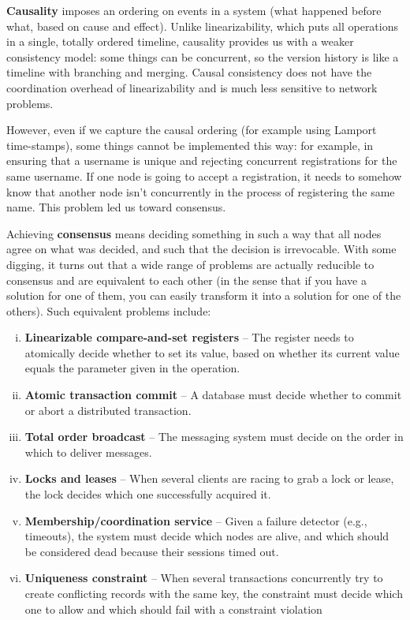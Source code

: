 \documentclass{article}
\begin{document}
    \textbf{Causality} imposes an ordering on events in a system (what happened before what, based on cause and effect). Unlike linearizability, which puts all operations in a single, totally ordered timeline, causality provides us with a weaker consistency model: some things can be concurrent, so the version history is like a timeline with branching and merging. Causal consistency does not have the coordination overhead of linearizability and is much less sensitive to network problems.
    
    However, even if we capture the causal ordering (for example using Lamport time-stamps), some things cannot be implemented this way: for example, in ensuring that a username is unique and rejecting concurrent registrations for the same username. If one node is going to accept a registration, it needs to somehow know that another node isn’t concurrently in the process of registering the same name. This problem led us toward consensus.
    
    Achieving \textbf{consensus} means deciding something in such a way that all nodes agree on what was decided, and such that the decision is irrevocable. With some digging, it turns out that a wide range of problems are actually reducible to consensus and are equivalent to each other (in the sense that if you have a solution for one of them, you can easily transform it into a solution for one of the others). Such equivalent problems include:
    
    \begin{enumerate}[i.]
        \item \textbf{Linearizable compare-and-set registers} -- The register needs to atomically decide whether to set its value, based on whether its current value equals the parameter given in the operation.
        
        \item \textbf{Atomic transaction commit} -- A database must decide whether to commit or abort a distributed transaction.
        
        \item \textbf{Total order broadcast} -- The messaging system must decide on the order in which to deliver messages.
        
        \item \textbf{Locks and leases} --  When several clients are racing to grab a lock or lease, the lock decides which one successfully acquired it.
        
        \item \textbf{Membership/coordination service} -- Given a failure detector (e.g., timeouts), the system must decide which nodes are alive, and which should be considered dead because their sessions timed out.
        
        \item \textbf{Uniqueness constraint} -- When several transactions concurrently try to create conflicting records with the same key, the constraint must decide which one to allow and which should fail with a constraint violation
    \end{enumerate}
\end{document}
